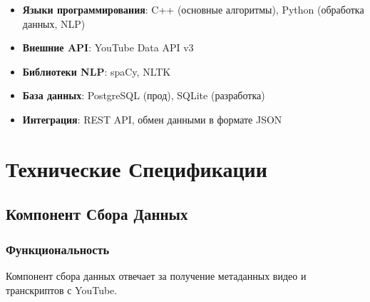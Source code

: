 \documentclass[12pt,a4paper]{article}
\begin{document}
\begin{itemize}
    \item \textbf{Языки программирования}: C++ (основные алгоритмы), Python (обработка данных, NLP)
    \item \textbf{Внешние API}: YouTube Data API v3
    \item \textbf{Библиотеки NLP}: spaCy, NLTK
    \item \textbf{База данных}: PostgreSQL (прод), SQLite (разработка)
    \item \textbf{Интеграция}: REST API, обмен данными в формате JSON
\end{itemize}

\newpage
\section{Технические Спецификации}

\subsection{Компонент Сбора Данных}

\subsubsection{Функциональность}
Компонент сбора данных отвечает за получение метаданных видео и транскриптов с YouTube.
\end{document}
